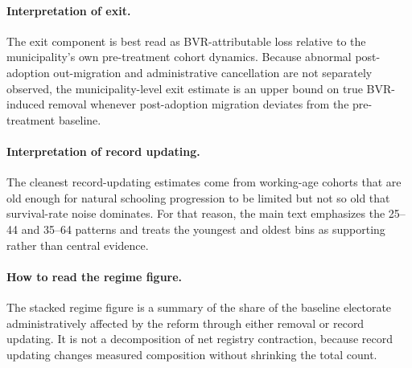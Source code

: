 \paragraph{Interpretation of exit.}
The exit component is best read as BVR-attributable loss relative to the municipality's own pre-treatment cohort dynamics. Because abnormal post-adoption out-migration and administrative cancellation are not separately observed, the municipality-level exit estimate is an upper bound on true BVR-induced removal whenever post-adoption migration deviates from the pre-treatment baseline.

\paragraph{Interpretation of record updating.}
The cleanest record-updating estimates come from working-age cohorts that are old enough for natural schooling progression to be limited but not so old that survival-rate noise dominates. For that reason, the main text emphasizes the 25--44 and 35--64 patterns and treats the youngest and oldest bins as supporting rather than central evidence.

\paragraph{How to read the regime figure.}
The stacked regime figure is a summary of the share of the baseline electorate administratively affected by the reform through either removal or record updating. It is not a decomposition of net registry contraction, because record updating changes measured composition without shrinking the total count.



